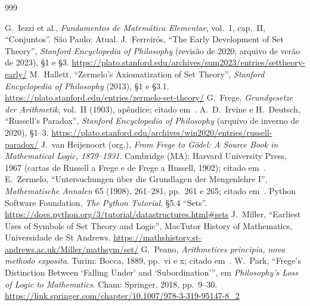 \begingroup
\makeatletter
\renewcommand{\chapter}{\@ifstar{\@gobble}{\@gobble}}
\renewcommand{\@mkboth}[2]{}
\makeatother
\begin{thebibliography}{999}\setlength{\itemsep}{0.2em}
\raggedright
{} G.~Iezzi et al., \emph{Fundamentos de Matemática Elementar}, vol.~1, cap.~II, \enquote{Conjuntos}. São Paulo: Atual.
 J.~Ferreirós, \enquote{The Early Development of Set Theory}, \emph{Stanford Encyclopedia of Philosophy} (revisão de 2020; arquivo de verão de 2023), §1 e §3. \url{https://plato.stanford.edu/archives/sum2023/entries/settheory-early/}
 M.~Hallett, \enquote{Zermelo's Axiomatization of Set Theory}, \emph{Stanford Encyclopedia of Philosophy} (2013), §1 e §3.1. \url{https://plato.stanford.edu/entries/zermelo-set-theory/}
 G.~Frege, \emph{Grundgesetze der Arithmetik}, vol.~II (1903), apêndice; citado em~\cite{sepZermelo}.
 A.~D.~Irvine e H.~Deutsch, \enquote{Russell's Paradox}, \emph{Stanford Encyclopedia of Philosophy} (arquivo de inverno de 2020), §1--3. \url{https://plato.stanford.edu/archives/win2020/entries/russell-paradox/}
 J.~van Heijenoort (org.), \emph{From Frege to Gödel: A Source Book in Mathematical Logic, 1879--1931}. Cambridge (MA): Harvard University Press, 1967 (cartas de Russell a Frege e de Frege a Russell, 1902); citado em~\cite{sepRussell}.
 E.~Zermelo, \enquote{Untersuchungen über die Grundlagen der Mengenlehre I}, \emph{Mathematische Annalen} 65 (1908), 261--281, pp.~261 e 265; citado em~\cite{sepZermelo}.
 Python Software Foundation, \emph{The Python Tutorial}, §5.4 \enquote{Sets}. \url{https://docs.python.org/3/tutorial/datastructures.html\#sets}
 J.~Miller, \enquote{Earliest Uses of Symbols of Set Theory and Logic}, MacTutor History of Mathematics, Universidade de St Andrews. \url{https://mathshistory.st-andrews.ac.uk/Miller/mathsym/set/}
 G.~Peano, \emph{Arithmetices principia, nova methodo exposita}. Turim: Bocca, 1889, pp.~vi e x; citado em~\cite{mactutorSym}.
 W.~Park, \enquote{Frege's Distinction Between `Falling Under' and `Subordination'}, em \emph{Philosophy's Loss of Logic to Mathematics}. Cham: Springer, 2018, pp.~9--30. \url{https://link.springer.com/chapter/10.1007/978-3-319-95147-8_2}

\end{thebibliography}
